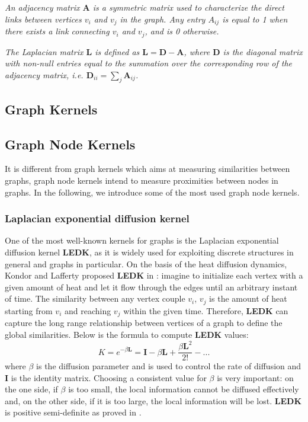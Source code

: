 \begin{definition}{}
\textit{An adjacency matrix $\textbf{A}$ is a symmetric matrix used to characterize the direct links between vertices $v_{i}$ and $v_{j}$ in the graph. Any entry $A_{ij}$ is equal to 1 when there exists a link connecting $v_{i}$ and $v_{j}$, and is 0 otherwise.}
\end{definition}

\begin{definition}{}
\textit{The Laplacian matrix $\textbf{L}$ is defined as $\textbf{L} = \textbf{D}-\textbf{A}$, where $\textbf{D}$ is the diagonal matrix with non-null entries equal to the summation over the corresponding row of the adjacency matrix, i.e. $\textbf{D}_{ii}=\sum_j \textbf{A}_{ij}$.}
\end{definition}
\subsection{Graph Kernels}

\subsection{Graph Node Kernels}
It is different from graph kernels which aims at measuring similarities between graphs, graph node kernels intend to measure proximities between nodes in graphs. In the following, we introduce some of the most used graph node kernels.
\subsubsection{Laplacian exponential diffusion kernel}
One of the most well-known kernels for graphs is the Laplacian exponential diffusion kernel \textbf{LEDK}, as it is widely used for exploiting discrete structures in general and graphs in particular. On the basis of the heat diffusion dynamics, Kondor and Lafferty proposed \textbf{LEDK} in \cite{kondor2002diffusion}: imagine to initialize each vertex with a given amount of heat and let it flow through the edges until an arbitrary instant of time. The similarity between any vertex couple $v_{i}$, $v_{j}$ is the amount of heat starting from $v_{i}$ and reaching $v_{j}$ within the given time. Therefore, \textbf{LEDK} can capture the long range relationship between vertices of a graph to define the global similarities. Below is the formula to compute \textbf{LEDK} values:
\begin{equation} 
\label{LEDK-formula}
K = e^{-\beta \textbf{L}} = \textbf{I} - \beta \textbf{L} + \frac{\beta \textbf{L}^{2}}{2!} - ...
\end{equation}
where $\beta$ is the diffusion parameter and is used to control the rate of diffusion and $\textbf{I}$ is the identity matrix. Choosing a consistent value for $\beta$ is very important: on the one side, if $\beta$ is too small, the local information cannot be diffused effectively and, on the other side, if it is too large, the local information will be lost. \textbf{LEDK} is positive semi-definite as proved in \cite{kondor2002diffusion}.
